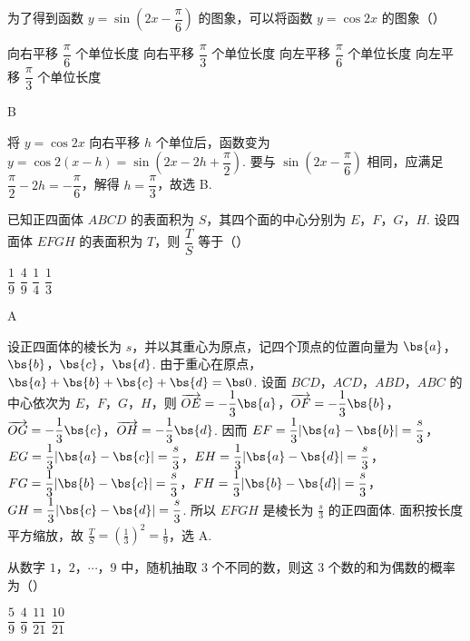 \begin{problem}
为了得到函数 \(y=\sin\left(2x-\dfrac\pi6\right)\) 的图象，可以将函数 \(y=\cos2x\) 的图象（\quad）

\choices
    {向右平移 \(\dfrac\pi6\) 个单位长度}
    {向右平移 \(\dfrac\pi3\) 个单位长度}
    {向左平移 \(\dfrac\pi6\) 个单位长度}
    {向左平移 \(\dfrac\pi3\) 个单位长度}
\end{problem}

\begin{answer}
B
\end{answer}

\begin{solution}
将 \(y=\cos2x\) 向右平移 \(h\) 个单位后，函数变为 \(y=\cos2(x-h)=\sin\left(2x-2h+\dfrac\pi2\right)\). 要与 \(\sin\left(2x-\dfrac\pi6\right)\) 相同，应满足 \(\dfrac\pi2-2h=-\dfrac\pi6\)，解得 \(h=\dfrac\pi3\)，故选 B.
\end{solution}

\begin{problem}
已知正四面体 \(ABCD\) 的表面积为 \(S\)，其四个面的中心分别为 \(E\)，\(F\)，\(G\)，\(H\). 设四面体 \(EFGH\) 的表面积为 \(T\)，则 \(\dfrac TS\) 等于（\quad）

\choices
    {\(\dfrac19\)}
    {\(\dfrac49\)}
    {\(\dfrac14\)}
    {\(\dfrac13\)}
\end{problem}

\begin{answer}
A
\end{answer}

\begin{solution}
设正四面体的棱长为 \(s\)，并以其重心为原点，记四个顶点的位置向量为 \(\bs{a}\)，\(\bs{b}\)，\(\bs{c}\)，\(\bs{d}\). 由于重心在原点，\(\bs{a}+\bs{b}+\bs{c}+\bs{d}=\bs0\). 设面 \(BCD\)，\(ACD\)，\(ABD\)，\(ABC\) 的中心依次为 \(E\)，\(F\)，\(G\)，\(H\)，则 \(\overrightarrow{OE}=-\dfrac13\bs{a}\)，\(\overrightarrow{OF}=-\dfrac13\bs{b}\)，\(\overrightarrow{OG}=-\dfrac13\bs{c}\)，\(\overrightarrow{OH}=-\dfrac13\bs{d}\). 因而 \(EF=\dfrac13|\bs{a}-\bs{b}|=\dfrac s3\)，\(EG=\dfrac13|\bs{a}-\bs{c}|=\dfrac s3\)，\(EH=\dfrac13|\bs{a}-\bs{d}|=\dfrac s3\)，\(FG=\dfrac13|\bs{b}-\bs{c}|=\dfrac s3\)，\(FH=\dfrac13|\bs{b}-\bs{d}|=\dfrac s3\)，\(GH=\dfrac13|\bs{c}-\bs{d}|=\dfrac s3\). 所以 \(EFGH\) 是棱长为 \(\frac{s}{3}\) 的正四面体. 面积按长度平方缩放，故 \(\frac{T}{S}=(\frac{1}{3})^2=\frac{1}{9}\)，选 A.
\end{solution}

\begin{problem}
从数字 \(1\)，\(2\)，\(\cdots\)，\(9\) 中，随机抽取 \(3\) 个不同的数，则这 \(3\) 个数的和为偶数的概率为（\quad）

\choices
    {\(\dfrac59\)}
    {\(\dfrac49\)}
    {\(\dfrac{11}{21}\)}
    {\(\dfrac{10}{21}\)}
\end{problem}

